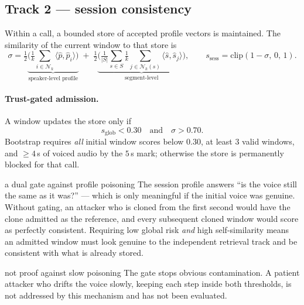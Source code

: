 \documentclass[11pt,a4paper]{article}
\newcommand{\unitvec}[1]{\widehat{#1}}
\begin{document}
\subsection{Track 2 --- session consistency}

Within a call, a bounded store of accepted profile vectors is maintained. The similarity
of the current window to that store is
\begin{equation}
\sigma = \tfrac12 \underbrace{\Big(\tfrac{1}{k}\!\!\sum_{i \in \mathcal{N}_k}\!\! \langle \unitvec{p},\unitvec{p}_i\rangle\Big)}_{\text{speaker-level profile}}
\;+\; \tfrac12 \underbrace{\Big(\tfrac{1}{|S|}\sum_{s \in S} \tfrac{1}{k}\!\!\sum_{j \in \mathcal{N}_k(s)}\!\! \langle \unitvec{s},\unitvec{s}_j\rangle\Big)}_{\text{segment-level}},
\qquad
s_{\mathrm{sess}} = \mathrm{clip}(1-\sigma,\,0,\,1).
\end{equation}

\paragraph{Trust-gated admission.} A window updates the store only if
\begin{equation}
s_{\mathrm{glob}} < 0.30 \quad\text{and}\quad \sigma > 0.70 .
\end{equation}
Bootstrap requires \emph{all} initial window scores below $0.30$, at least $3$ valid
windows, and $\ge 4$\,s of voiced audio by the $5$\,s mark; otherwise the store is
permanently blocked for that call.

\begin{whybox}{a dual gate against profile poisoning}
The session profile answers ``is the voice still the same as it was?'' --- which is only
meaningful if the initial voice was genuine. Without gating, an attacker who is cloned
from the first second would have the clone admitted as the reference, and every
subsequent cloned window would score as perfectly consistent. Requiring low global risk
\emph{and} high self-similarity means an admitted window must look genuine to the
independent retrieval track and be consistent with what is already stored.
\end{whybox}

\begin{warnbox}{not proof against slow poisoning}
The gate stops obvious contamination. A patient attacker who drifts the voice slowly,
keeping each step inside both thresholds, is not addressed by this mechanism and has not
been evaluated.
\end{warnbox}
\end{document}
